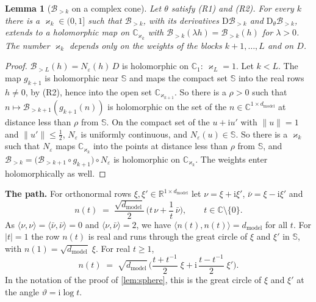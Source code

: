 \documentclass[10pt]{article}
\newtheorem{lemma}[theorem]{Lemma}
\theoremstyle{definition}
\theoremstyle{remark}
\newcommand{\R}{\mathbb{R}}
\newcommand{\dm}{d_{\mathrm{model}}}
\newcommand{\Der}{\mathrm{D}}
\newcommand{\norm}[1]{\lVert #1\rVert}
\newcommand{\para}[1]{\smallskip\noindent\textbf{#1}\hspace{0.5em}}
\begin{document}
\begin{lemma}[$\mathcal B_{>k}$ on a complex cone]\label{lem:e0cone}
Let $\theta$ satisfy (R1) and (R2). For every $k$ there is a $\varkappa_k \in (0, 1]$ such that $\mathcal B_{>k}$, with its derivatives $\Der\mathcal B_{>k}$ and $\Der_\theta\mathcal B_{>k}$, extends to a holomorphic map on $\mathbb C_{\varkappa_k}$ with $\mathcal B_{>k}(\lambda h) = \mathcal B_{>k}(h)$ for $\lambda > 0$. The number $\varkappa_k$ depends only on the weights of the blocks $k+1, \dots, L$ and on $D$.
\end{lemma}

\begin{proof}
$\mathcal B_{>L}(h) = N_\varepsilon(h)\,D$ is holomorphic on $\mathbb C_1$: $\varkappa_L = 1$. Let $k < L$. The map $g_{k+1}$ is holomorphic near $\mathbb S$ and maps the compact set $\mathbb S$ into the real rows $h \neq 0$, by (R2), hence into the open set $\mathbb C_{\varkappa_{k+1}}$. So there is a $\rho > 0$ such that $n \mapsto \mathcal B_{>k+1}(g_{k+1}(n))$ is holomorphic on the set of the $n \in \mathbb C^{1\times\dm}$ at distance less than $\rho$ from $\mathbb S$. On the compact set of the $u + \mathrm iu'$ with $\norm{u} = 1$ and $\norm{u'} \le \frac12$, $N_\varepsilon$ is uniformly continuous, and $N_\varepsilon(u) \in \mathbb S$. So there is a $\varkappa_k$ such that $N_\varepsilon$ maps $\mathbb C_{\varkappa_k}$ into the points at distance less than $\rho$ from $\mathbb S$, and $\mathcal B_{>k} = \big(\mathcal B_{>k+1}\circ g_{k+1}\big)\circ N_\varepsilon$ is holomorphic on $\mathbb C_{\varkappa_k}$. The weights enter holomorphically as well.
\end{proof}

\para{The path.} For orthonormal rows $\xi, \xi' \in \R^{1\times\dm}$ let $\nu = \xi + \mathrm i\xi'$, $\bar\nu = \xi - \mathrm i\xi'$ and
\[
n(t) \;=\; \frac{\sqrt{\dm}}{2}\,\Big(t\,\nu + \frac{1}{t}\,\bar\nu\Big), \qquad t \in \mathbb C\setminus\{0\}.
\]
As $\langle\nu, \nu\rangle = \langle\bar\nu, \bar\nu\rangle = 0$ and $\langle\nu, \bar\nu\rangle = 2$, we have $\langle n(t), n(t)\rangle = \dm$ for all $t$. For $\lvert t\rvert = 1$ the row $n(t)$ is real and runs through the great circle of $\xi$ and $\xi'$ in $\mathbb S$, with $n(1) = \sqrt{\dm}\;\xi$. For real $t \ge 1$,
\begin{equation}\label{eq:e0path}
n(t) \;=\; \sqrt{\dm}\,\Big(\frac{t + t^{-1}}{2}\;\xi + \mathrm i\,\frac{t - t^{-1}}{2}\;\xi'\Big).
\end{equation}
In the notation of the proof of \cref{lem:sphere}, this is the great circle of $\xi$ and $\xi'$ at the angle $\vartheta = \mathrm i\log t$.
\end{document}
